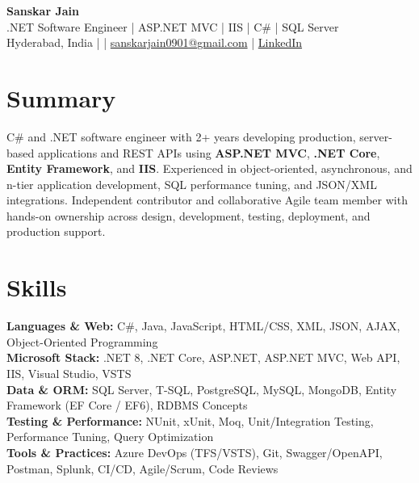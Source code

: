 \documentclass[10pt,letterpaper]{article}
\begin{document}
\begin{center}
    {\Large \textbf{Sanskar Jain}} \\
    .NET Software Engineer \;|\; ASP.NET MVC \;|\; IIS \;|\; C\# \;|\; SQL Server \\
    Hyderabad, India \enspace |  \enspace | \enspace
    \href{mailto:sanskarjain0901@gmail.com}{sanskarjain0901@gmail.com} \enspace | \enspace
    \href{https://www.linkedin.com/in/sanskar-jain0901/}{LinkedIn}
\end{center}

\vspace{2pt}

\section*{Summary}
C\# and .NET software engineer with 2+ years developing production, server-based applications and REST APIs using \textbf{ASP.NET MVC}, \textbf{.NET Core}, \textbf{Entity Framework}, and \textbf{IIS}. Experienced in object-oriented, asynchronous, and n-tier application development, SQL performance tuning, and JSON/XML integrations. Independent contributor and collaborative Agile team member with hands-on ownership across design, development, testing, deployment, and production support.

\section*{Skills}
\textbf{Languages \& Web:} C\#, Java, JavaScript, HTML/CSS, XML, JSON, AJAX, Object-Oriented Programming \\
\textbf{Microsoft Stack:} .NET 8, .NET Core, ASP.NET, ASP.NET MVC, Web API, IIS, Visual Studio, VSTS \\
\textbf{Data \& ORM:} SQL Server, T-SQL, PostgreSQL, MySQL, MongoDB, Entity Framework (EF Core / EF6), RDBMS Concepts \\
\textbf{Testing \& Performance:} NUnit, xUnit, Moq, Unit/Integration Testing, Performance Tuning, Query Optimization \\
\textbf{Tools \& Practices:} Azure DevOps (TFS/VSTS), Git, Swagger/OpenAPI, Postman, Splunk, CI/CD, Agile/Scrum, Code Reviews
\end{document}
